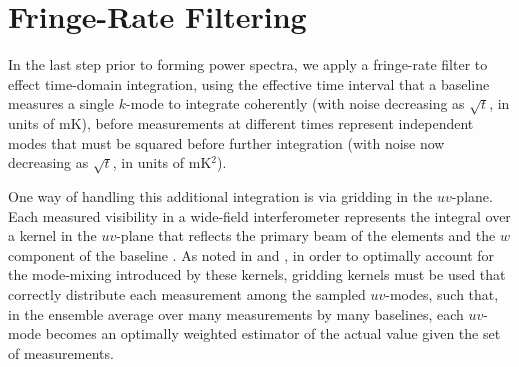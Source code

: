 \documentclass[twocolumn,apj,numberedappendix]{emulateapj}
\begin{document}
%
%

\section{Fringe-Rate Filtering}
\label{sec:fringe_rate_filtering}

In the last step prior to forming power spectra,
we apply a fringe-rate filter to effect time-domain integration,
using the effective time interval that a baseline measures a single $k$-mode to integrate coherently
(with noise decreasing
as $\sqrt{t}$, in units of mK), before measurements at different times represent independent modes
that must be squared before further integration (with noise now decreasing as $\sqrt{t}$, in units of mK$^2$).

One way of handling this additional integration is via gridding in the $uv$-plane.
Each measured visibility in a wide-field interferometer represents the integral over a kernel in
the $uv$-plane that reflects the primary beam of the elements \citep{bhatnagar_et_al2008,morales_matejek2009} and the $w$ component 
of the baseline \citep{cornwell_et_al2003}.  As noted in
\citet{sullivan_et_al2012} and \citet{morales_matejek2009},
in order to optimally account for the mode-mixing introduced by these kernels, gridding kernels must be
used that correctly distribute each measurement among the sampled $uv$-modes, such that, in the ensemble average
over many measurements by many baselines, each $uv$-mode becomes an optimally weighted estimator of the actual
value given the set of measurements.
\end{document}
